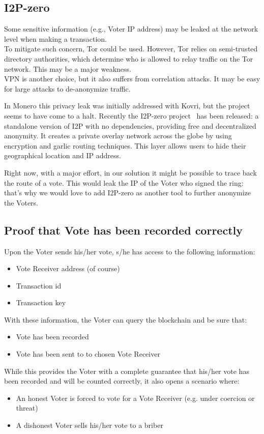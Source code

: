\documentclass[10pt, letterpaper]{article}
\begin{document}
\subsection{I2P-zero}
Some sensitive information (e.g., Voter IP address) may be leaked at the network level when making a transaction.\\
To mitigate such concern, Tor could be used. However, Tor relies on semi-trusted directory authorities, which determine who is allowed to relay traffic on the Tor network. This may be a major weakness.\\
VPN is another choice, but it also suffers from correlation attacks. It may be easy for large attacks to de-anonymize traffic.
\bigskip

In Monero this privacy leak was initially addressed with Kovri, but the project seems to have come to a halt. Recently the I2P-zero project~\cite{i2p-zero:Online} has been released: a standalone version of I2P with no dependencies, providing free and decentralized anonymity. It creates a private overlay network across the globe by using encryption and garlic routing techniques. This layer allows users to hide their geographical location and IP address.
\bigskip

Right now, with a major effort, in our solution it might be possible to trace back the route of a vote. This would leak the IP of the Voter who signed the ring: that’s why we would love to add I2P-zero as another tool to further anonymize the Voters.

\subsection{Proof that Vote has been recorded correctly}
Upon the Voter sends his/her vote, s/he has access to the following information:
\begin{itemize}
\item Vote Receiver address (of course)
\item Transaction id
\item Transaction key
\end{itemize}
With these information, the Voter can query the blockchain and be sure that:
\begin{itemize}
\item Vote has been recorded
\item Vote has been sent to to chosen Vote Receiver
\end{itemize}

While this provides the Voter with a complete guarantee that his/her vote has been recorded and will be counted correctly, it also opens a scenario where:
\begin{itemize}
\item An honest Voter is forced to vote for a Vote Receiver (e.g. under coercion or threat)
\item A dishonest Voter sells his/her vote to a briber
\end{itemize}
\end{document}
